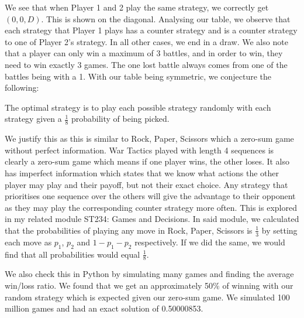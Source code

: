 \documentclass[11pt]{article}
\newcommand{\keywordfont}{\textsc}
\newcommand{\keyword}[1]{%
  \marginpar{\raggedright\small\keywordfont{#1}}}
\begin{document}
We see \keyword{Check}  that when Player 1 and 2 play the same strategy, we correctly get $(0, 0 ,D)$. This is shown on the diagonal. Analysing our table, we observe that each strategy that Player 1 plays has a counter strategy and is a counter strategy to one of Player  2's strategy. In all other cases, we end in a draw. We also note that a player can only win a maximum of 3 battles, and in order to win, they need to win exactly 3 games. The one lost battle always comes from one of the battles being with a 1. With our table being symmetric, we conjecture the following:

The optimal strategy \keyword{Conjecture} is to play each possible strategy randomly with each strategy given a $\frac{1}{8}$ probability of being picked.

We \keyword{Justify} justify this as this is similar to Rock, Paper, Scissors which a zero-sum game without perfect information. War Tactics played with length 4 sequences is clearly a zero-sum game which means if one player wins, the other loses. It also has imperfect information which states that we know what actions the other player may play and their payoff, but not their exact choice. Any strategy that prioritises one sequence over the others will give the advantage to their opponent as they may play the corresponding counter strategy more often. This is explored in my related module ST234: Games and Decisions. In said module, we calculated that the probabilities of playing any move in Rock, Paper, Scissors is $\frac{1}{3}$ by setting each move as $p_1$, $p_2$ and $1 - p_1 - p_2$ respectively. If we did the same, we would find that all probabilities would equal  $\frac{1}{8}$. 

We also check \keyword{Check} this in Python by simulating many games and finding the average win/loss ratio. We found that we get an approximately 50\% of winning with our random strategy which is expected given our zero-sum game. We simulated 100 million games and had an exact solution of 0.50000853. 
\end{document}
